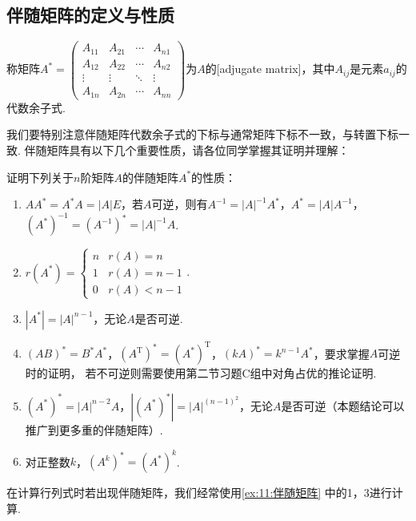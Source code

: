 \subsection{伴随矩阵的定义与性质}
\begin{definition}
    称矩阵$A^*=\begin{pmatrix}
        A_{11} & A_{21} & \cdots & A_{n1} \\
        A_{12} & A_{22} & \cdots & A_{n2} \\
        \vdots & \vdots & \ddots & \vdots \\
        A_{1n} & A_{2n} & \cdots & A_{nn}
    \end{pmatrix}$为$A$的[adjugate matrix]，其中$A_{ij}$是元素$a_{ij}$的代数余子式.
\end{definition}
我们要特别注意伴随矩阵代数余子式的下标与通常矩阵下标不一致，与转置下标一致.
伴随矩阵具有以下几个重要性质，请各位同学掌握其证明并理解：
\begin{example} \label{ex:11:伴随矩阵}
    证明下列关于$n$阶矩阵$A$的伴随矩阵$A^*$的性质：
    \begin{enumerate}
        \item $AA^*=A^*A=|A|E$，若$A$可逆，则有$A^{-1}=|A|^{-1}A^*$，$A^*=|A|A^{-1}$，$(A^*)^{-1}=(A^{-1})^*=|A|^{-1}A$.

        \item $r(A^*)=\begin{cases}
        n & r(A)=n \\ 1 & r(A)=n-1 \\ 0 & r(A) < n-1
    \end{cases}$.

        \item $|A^*|=|A|^{n-1}$，无论$A$是否可逆.

        \item $(AB)^*=B^*A^*$，$(A^\mathrm{T})^*=(A^*)^\mathrm{T}$，$(kA)^*=k^{n-1}A^*$，要求掌握$A$可逆时的证明，
        若不可逆则需要使用第二节习题C组中对角占优的推论证明.

        \item $(A^*)^*=|A|^{n-2}A$，$|(A^*)^*|=|A|^{(n-1)^2}$，无论$A$是否可逆（本题结论可以推广到更多重的伴随矩阵）.

        \item 对正整数$k$，$(A^k)^*=(A^*)^k$.
    \end{enumerate}
\end{example}

在计算行列式时若出现伴随矩阵，我们经常使用\autoref{ex:11:伴随矩阵} 中的1，3进行计算.

